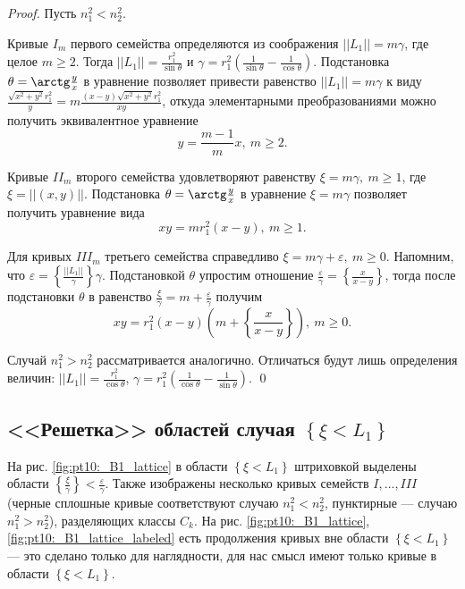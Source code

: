 \begin{proof}
Пусть $n_1^2 < n_2^2$.

Кривые $I_m$ первого семейства определяются из соображения $||L_1|| = m \gamma$, где целое $m \geq 2$. 
Тогда $||L_1|| = \frac{r_1^2}{\sin \theta}$ и $\gamma = r_1^2 \left( \frac{1}{\sin \theta} - \frac{1}{\cos \theta} \right)$.
Подстановка $\theta = \arctg \frac{y}{x}$ в уравнение позволяет привести равенство $||L_1|| = m \gamma$ к виду 
$ \frac{\sqrt{x^2 + y^2} r_1^2}{y} = m \frac{(x-y) \sqrt{x^2+y^2} r_1^2}{x y}$,
откуда элементарными преобразованиями можно получить эквивалентное уравнение 
$$y = \frac{m-1}{m} x, \ m \geq 2.$$

Кривые $II_m$ второго семейства удовлетворяют равенству $\xi = m \gamma, \ m \geq 1$, где $\xi = ||(x,y)||$.
Подстановка $\theta = \arctg \frac{y}{x}$ в уравнение $\xi = m \gamma$ позволяет получить уравнение вида 
$$x y = m r_1^2 (x-y), \ m\geq 1.$$ 

Для кривых $III_m$ третьего семейства справедливо $\xi = m \gamma + \varepsilon, \  m \geq 0$. 
Напомним, что $\varepsilon =  \left\{ \frac{||L_1||}{\gamma} \right\} \gamma$.
Подстановкой $\theta$ упростим отношение $\frac{\varepsilon}{\gamma}  = \left\{ \frac{x}{x-y} \right\}$, тогда после подстановки $\theta$  в равенство $\frac{\xi}{\gamma} = m + \frac{\varepsilon}{\gamma}$ получим
$$x y = r_1^2 (x-y) \left(  m + \left\{ \frac{x}{x-y} \right\} \right), \ m\geq 0.$$ 

Случай $n_1^2 > n_2^2$ рассматривается аналогично. Отличаться будут лишь определения величин:
$||L_1|| = \frac{r_1^2}{\cos \theta}$, $\gamma = r_1^2 \left( \frac{1}{\cos \theta} - \frac{1}{\sin \theta} \right)$. 
\qed
\end{proof}

\subsection{<<Решетка>> областей случая $\left\{\xi < L_1\right\}$}\label{s3.6}
На рис. \ref{fig:pt10:_B1_lattice} в области $\left\{\xi < L_1\right\}$ штриховкой выделены области $\left\{ \frac{\xi}{\gamma} \right\} < \frac{\varepsilon}{\gamma}$. 
Также изображены несколько кривых семейств $I, \ldots, III$ (черные сплошные кривые соответствуют случаю $n_1^2 < n_2^2$, пунктирные --- случаю $n_1^2 > n_2^2$), разделяющих классы $C_k$. 
На рис. \ref{fig:pt10:_B1_lattice}, \ref{fig:pt10:_B1_lattice_labeled} есть продолжения кривых вне области $\left\{\xi < L_1\right\}$ --- это сделано только для наглядности, для нас смысл имеют только кривые в области $\left\{\xi < L_1\right\}$.

